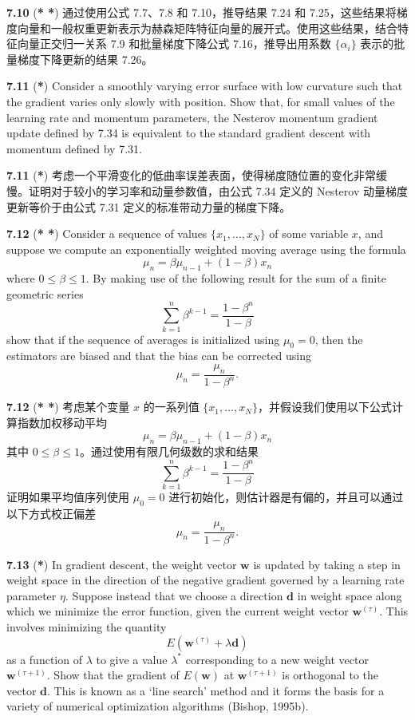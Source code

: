 \documentclass{article}
\begin{document}
\textbf{7.10} (\textbf{* *}) 通过使用公式 {7.7}、{7.8} 和 {7.10}，推导结果 {7.24} 和 {7.25}，这些结果将梯度向量和一般权重更新表示为赫森矩阵特征向量的展开式。使用这些结果，结合特征向量正交归一关系 {7.9} 和批量梯度下降公式 {7.16}，推导出用系数 $\{\alpha_i\}$ 表示的批量梯度下降更新的结果 {7.26}。

\textbf{7.11} (\textbf{*}) Consider a smoothly varying error surface with low curvature such that the gradient varies only slowly with position. Show that, for small values of the learning rate and momentum parameters, the Nesterov momentum gradient update defined by {7.34} is equivalent to the standard gradient descent with momentum defined by {7.31}.

\textbf{7.11} (\textbf{*}) 考虑一个平滑变化的低曲率误差表面，使得梯度随位置的变化非常缓慢。证明对于较小的学习率和动量参数值，由公式 {7.34} 定义的 Nesterov 动量梯度更新等价于由公式 {7.31} 定义的标准带动力量的梯度下降。

\textbf{7.12} (\textbf{* *}) Consider a sequence of values $\{x_1, \ldots, x_N\}$ of some variable $x$, and suppose we compute an exponentially weighted moving average using the formula
\[
\mu_n = \beta \mu_{n-1} + (1-\beta)x_n
\]
where $0 \leqslant \beta \leqslant 1$. By making use of the following result for the sum of a finite geometric series
\[
\sum_{k=1}^{n} \beta^{k-1} = \frac{1-\beta^n}{1-\beta}
\]
show that if the sequence of averages is initialized using $\mu_0 = 0$, then the estimators are biased and that the bias can be corrected using
\[
\widehat{\mu}_n = \frac{\mu_n}{1-\beta^n}.
\]

\textbf{7.12} (\textbf{* *}) 考虑某个变量 $x$ 的一系列值 $\{x_1, \ldots, x_N\}$，并假设我们使用以下公式计算指数加权移动平均
\[
\mu_n = \beta \mu_{n-1} + (1-\beta)x_n
\]
其中 $0 \leqslant \beta \leqslant 1$。通过使用有限几何级数的求和结果
\[
\sum_{k=1}^{n} \beta^{k-1} = \frac{1-\beta^n}{1-\beta}
\]
证明如果平均值序列使用 $\mu_0 = 0$ 进行初始化，则估计器是有偏的，并且可以通过以下方式校正偏差
\[
\widehat{\mu}_n = \frac{\mu_n}{1-\beta^n}.
\]

\textbf{7.13} (\textbf{*}) In gradient descent, the weight vector $\mathbf{w}$ is updated by taking a step in weight space in the direction of the negative gradient governed by a learning rate parameter $\eta$. Suppose instead that we choose a direction $\mathbf{d}$ in weight space along which we minimize the error function, given the current weight vector $\mathbf{w}^{(\tau)}$. This involves minimizing the quantity
\[
E(\mathbf{w}^{(\tau)} + \lambda \mathbf{d})
\]
as a function of $\lambda$ to give a value $\lambda^*$ corresponding to a new weight vector $\mathbf{w}^{(\tau+1)}$. Show that the gradient of $E(\mathbf{w})$ at $\mathbf{w}^{(\tau+1)}$ is orthogonal to the vector $\mathbf{d}$. This is known as a `line search' method and it forms the basis for a variety of numerical optimization algorithms (Bishop, 1995b).
\end{document}
